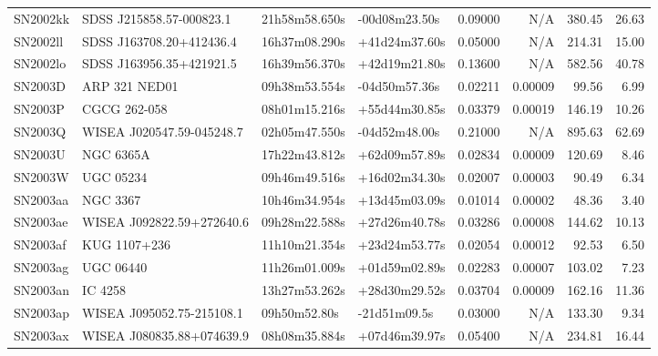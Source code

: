 \begin{longtable}{llllrrrr}
SN2002kk         &        SDSS J215858.57-000823.1 &   21h58m58.650s &   -00d08m23.50s &  0.09000 &      N/A &   380.45 &       26.63 \\
SN2002ll         &        SDSS J163708.20+412436.4 &   16h37m08.290s &   +41d24m37.60s &  0.05000 &      N/A &   214.31 &       15.00 \\
SN2002lo         &        SDSS J163956.35+421921.5 &   16h39m56.370s &   +42d19m21.80s &  0.13600 &      N/A &   582.56 &       40.78 \\
SN2003D          &                   ARP 321 NED01 &   09h38m53.554s &   -04d50m57.36s &  0.02211 &  0.00009 &    99.56 &        6.99 \\
SN2003P          &                    CGCG 262-058 &   08h01m15.216s &   +55d44m30.85s &  0.03379 &  0.00019 &   146.19 &       10.26 \\
SN2003Q          &       WISEA J020547.59-045248.7 &   02h05m47.550s &   -04d52m48.00s &  0.21000 &      N/A &   895.63 &       62.69 \\
SN2003U          &                       NGC 6365A &   17h22m43.812s &   +62d09m57.89s &  0.02834 &  0.00009 &   120.69 &        8.46 \\
SN2003W          &                       UGC 05234 &   09h46m49.516s &   +16d02m34.30s &  0.02007 &  0.00003 &    90.49 &        6.34 \\
SN2003aa         &                        NGC 3367 &   10h46m34.954s &   +13d45m03.09s &  0.01014 &  0.00002 &    48.36 &        3.40 \\
SN2003ae         &       WISEA J092822.59+272640.6 &   09h28m22.588s &   +27d26m40.78s &  0.03286 &  0.00008 &   144.62 &       10.13 \\
SN2003af         &                    KUG 1107+236 &   11h10m21.354s &   +23d24m53.77s &  0.02054 &  0.00012 &    92.53 &        6.50 \\
SN2003ag         &                       UGC 06440 &   11h26m01.009s &   +01d59m02.89s &  0.02283 &  0.00007 &   103.02 &        7.23 \\
SN2003an         &                         IC 4258 &   13h27m53.262s &   +28d30m29.52s &  0.03704 &  0.00009 &   162.16 &       11.36 \\
SN2003ap         &       WISEA J095052.75-215108.1 &    09h50m52.80s &    -21d51m09.5s &  0.03000 &      N/A &   133.30 &        9.34 \\
SN2003ax         &       WISEA J080835.88+074639.9 &   08h08m35.884s &   +07d46m39.97s &  0.05400 &      N/A &   234.81 &       16.44 \\

\end{longtable}
